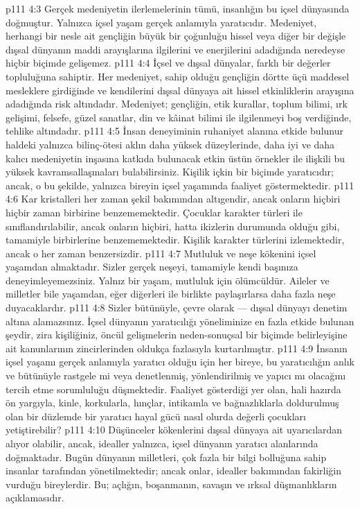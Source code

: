 \vs p111 4:3 Gerçek medeniyetin ilerlemelerinin tümü, insanlığın bu içsel dünyasında doğmuştur. Yalnızca içsel yaşam gerçek anlamıyla yaratıcıdır. Medeniyet, herhangi bir nesle ait gençliğin büyük bir çoğunluğu hissel veya diğer bir değişle dışsal dünyanın maddi arayışlarına ilgilerini ve enerjilerini adadığında neredeyse hiçbir biçimde gelişemez.
\vs p111 4:4 İçsel ve dışsal dünyalar, farklı bir değerler topluluğuna sahiptir. Her medeniyet, sahip olduğu gençliğin dörtte üçü maddesel mesleklere girdiğinde ve kendilerini dışsal dünyaya ait hissel etkinliklerin arayışına adadığında risk altındadır. Medeniyet; gençliğin, etik kurallar, toplum bilimi, ırk gelişimi, felsefe, güzel sanatlar, din ve kâinat bilimi ile ilgilenmeyi boş verdiğinde, tehlike altındadır.
\vs p111 4:5 İnsan deneyiminin ruhaniyet alanına etkide bulunur haldeki yalnızca bilinç\hyp{}ötesi aklın daha yüksek düzeylerinde, daha iyi ve daha kalıcı medeniyetin inşasına katkıda bulunacak etkin üstün örnekler ile ilişkili bu yüksek kavramsallaşmaları bulabilirsiniz. Kişilik içkin bir biçimde yaratıcıdır; ancak, o bu şekilde, yalnızca bireyin içsel yaşamında faaliyet göstermektedir.
\vs p111 4:6 Kar kristalleri her zaman şekil bakımından altıgendir, ancak onların hiçbiri hiçbir zaman birbirine benzememektedir. Çocuklar karakter türleri ile sınıflandırılabilir, ancak onların hiçbiri, hatta ikizlerin durumunda olduğu gibi, tamamiyle birbirlerine benzememektedir. Kişilik karakter türlerini izlemektedir, ancak o her zaman benzersizdir.
\vs p111 4:7 Mutluluk ve neşe kökenini içsel yaşamdan almaktadır. Sizler gerçek neşeyi, tamamiyle kendi başınıza deneyimleyemezsiniz. Yalnız bir yaşam, mutluluk için ölümcüldür. Aileler ve milletler bile yaşamdan, eğer diğerleri ile birlikte paylaşırlarsa daha fazla neşe duyacaklardır.
\vs p111 4:8 Sizler bütünüyle, çevre olarak --- dışsal dünyayı denetim altına alamazsınız. İçsel dünyanın yaratıcılığı yöneliminize en fazla etkide bulunan şeydir, zira kişiliğiniz, öncül gelişmelerin neden\hyp{}sonuçsal bir biçimde belirleyişine ait kanunlarının zincirlerinden oldukça fazlasıyla kurtarılmıştır.
\vs p111 4:9 İnsanın içsel yaşamı gerçek anlamıyla yaratıcı olduğu için her bireye, bu yaratıcılığın anlık ve bütünüyle rastgele mi veya denetlenmiş, yönlendirilmiş ve yapıcı mı olacağını tercih etme sorumluluğu düşmektedir. Faaliyet gösterdiği yer olan, hali hazırda ön yargıyla, kinle, korkularla, hınçlar, intikamla ve bağnazlıklarla doldurulmuş olan bir düzlemde bir yaratıcı hayal gücü nasıl olurda değerli çocukları yetiştirebilir?
\vs p111 4:10 Düşünceler kökenlerini dışsal dünyaya ait uyarıcılardan alıyor olabilir, ancak, idealler yalnızca, içsel dünyanın yaratıcı alanlarında doğmaktadır. Bugün dünyanın milletleri, çok fazla bir bilgi bolluğuna sahip insanlar tarafından yönetilmektedir; ancak onlar, idealler bakımından fakirliğin vurduğu bireylerdir. Bu; açlığın, boşanmanın, savaşın ve ırksal düşmanlıkların açıklamasıdır.
